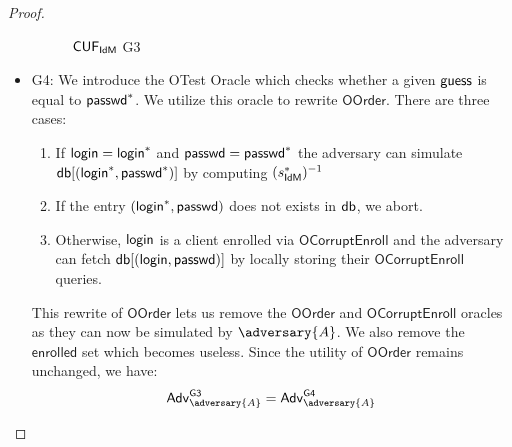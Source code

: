 \begin{proof}
\begin{itemize}
\begin{figure*}
{\begin{pchstack}[center, space=0.2cm, boxed]
\begin{pcvstack}
    \end{pcvstack}
    \begin{pcvstack}
    \end{pcvstack}
    \end{pchstack}
}
\caption{$\mathsf{CUF}_{\textsf{IdM}}$ \textsf{G3}}
\label{game:cuf_idmg3}
\end{figure*}
        \item \textsf{G4}: We introduce the \textsf{OTest} Oracle which checks whether a given $\mathsf{guess}$ is equal to $\textsf{passwd}^*$. We utilize this oracle to rewrite $\mathsf{OOrder}$. There are three cases:
        \begin{enumerate}
            \item If $\mathsf{login} = 
        \mathsf{login}^*$ and $\textsf{passwd} = \textsf{passwd}^*$ the adversary can simulate $\mathsf{db}[(\mathsf{login}^*, \textsf{passwd}^*)]$ by computing $(s_{\textsf{IdM}}^*)^{-1}$ 
            \item If the entry $(\mathsf{login}^*, \textsf{passwd})$ does not exists in $\mathsf{db}$, we abort.
            \item Otherwise, $\mathsf{login}$ is a client enrolled via $\mathsf{OCorruptEnroll}$ and the adversary can fetch $\mathsf{db}[(\mathsf{login}, \textsf{passwd})]$ by locally storing their $\mathsf{OCorruptEnroll}$ queries.
        \end{enumerate} 
        This rewrite of $\mathsf{OOrder}$ lets us remove the $\mathsf{OOrder}$ and $\mathsf{OCorruptEnroll}$ oracles as they can now be simulated by $\adversary{A}$. We also remove the $\mathsf{enrolled}$ set which becomes useless. Since the utility of $\mathsf{OOrder}$ remains unchanged, we have:
        \begin{align*}
            \advtg_\adversary{A}^{\mathsf{G3}} = \advtg_\adversary{A}^{\mathsf{G4}}\\
        \end{align*}
        


\end{itemize}
\end{proof}
